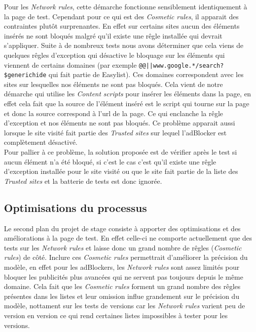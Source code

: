 \documentclass[oneside,a4paper,12pt]{article}
\begin{document}
Pour les \textit{Network rules}, cette démarche fonctionne sensiblement identiquement à la page de test. Cependant pour ce qui est des \textit{Cosmetic rules}, il apparait des contraintes plutôt surprenantes. En effet sur certains sites aucun des éléments insérés ne sont bloqués malgré qu'il existe une rêgle installée qui devrait s'appliquer. Suite à de nombreux tests nous avons déterminer que cela viens de quelques rêgles d'exception qui désactive le bloquage sur les éléments qui viennent de certains domaines (par exemple \lstinline{@@||www.google.*/search?$generichide} qui fait partie de Easylist). Ces domaines correspondent avec les sites sur lesquelles nos éléments ne sont pas bloqués. Cela vient de notre démarche qui utilise les \textit{Content scripts} pour insérer les éléments dans la page, en effet cela fait que la source de l'élément inséré est le script qui tourne sur la page et donc la source correspond à l'url de la page. Ce qui enclanche la rêgle d'exception et nos éléments ne sont pas bloqués. Ce problème apparait aussi lorsque le site visité fait partie des \textit{Trusted sites} sur lequel l'adBlocker est complètement désactivé.\\

Pour pallier à ce problème, la solution proposée est de vérifier après le test si aucun élément n'a été bloqué, si c'est le cas c'est qu'il existe une rêgle d'exception installée pour le site visité ou que le site fait partie de la liste des \textit{Trusted sites} et la batterie de tests est donc ignorée.

\subsection{Optimisations du processus}\label{Projet:opti}

Le second plan du projet de stage consiste à apporter des optimisations et des améliorations à la page de test. En effet celle-ci ne comporte actuellement que des tests sur les \textit{Network rules} et laisse donc un grand nombre de rêgles (\textit{Cosmetic rules}) de côté. Inclure ces \textit{Cosmetic rules} permettrait d'améliorer la précision du modèle, en effet pour les adBlockers, les \textit{Network rules} sont assez limités pour bloquer les publicités plus avancées qui ne servent pas toujours depuis le même domaine. Cela fait que les \textit{Cosmetic rules} forment un grand nombre des rêgles présentes dans les listes et leur omission influe grandement sur le précision du modèle, nottament sur les tests de versions car les \textit{Network rules} varient peu de version en version ce qui rend certaines listes impossibles à tester pour les versions.\\
\end{document}
